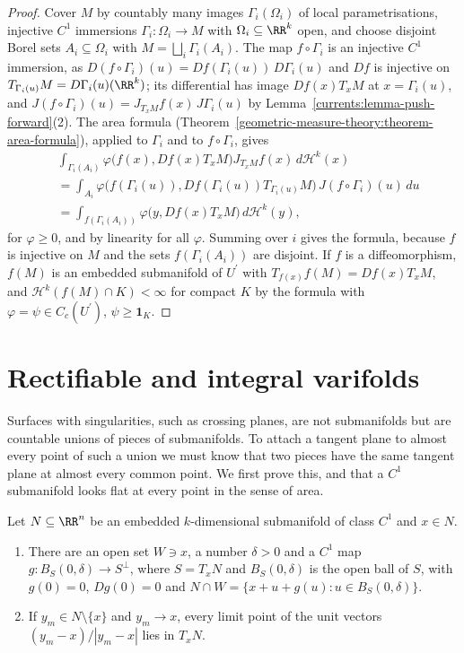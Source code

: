 \begin{proof}
Cover $M$ by countably many images $\Gamma_i(\Omega_i)$ of local parametrisations, injective $C^1$ immersions $\Gamma_i \colon \Omega_i \to M$ with $\Omega_i \subseteq \RR^k$ open, and choose disjoint Borel sets
$A_i \subseteq \Omega_i$ with $M = \bigsqcup_i\Gamma_i(A_i)$. The map $f \circ \Gamma_i$ is an injective $C^1$ immersion, as $D(f \circ \Gamma_i)(u) = Df(\Gamma_i(u))\,D\Gamma_i(u)$ and $Df$ is injective on
$T_{\Gamma_i(u)}M = D\Gamma_i(u)(\RR^k)$; its differential has image $Df(x)T_xM$ at $x = \Gamma_i(u)$, and $J(f \circ \Gamma_i)(u) = J_{T_xM}f(x)\,J\Gamma_i(u)$ by
Lemma~\ref{currents:lemma-push-forward}(2). The area formula (Theorem~\ref{geometric-measure-theory:theorem-area-formula}), applied to $\Gamma_i$ and to $f \circ \Gamma_i$, gives
\[
\begin{aligned}
&\int_{\Gamma_i(A_i)}\varphi\bigl(f(x), Df(x)T_xM\bigr)J_{T_xM}f(x)\,d\mathcal{H}^k(x) \\
&= \int_{A_i}\varphi\bigl(f(\Gamma_i(u)), Df(\Gamma_i(u))T_{\Gamma_i(u)}M\bigr)\,J(f \circ \Gamma_i)(u)\,du \\
&= \int_{f(\Gamma_i(A_i))}\varphi\bigl(y, Df(x)T_xM\bigr)\,d\mathcal{H}^k(y),
\end{aligned}
\]
for $\varphi \geq 0$, and by linearity for all $\varphi$. Summing over $i$ gives the formula, because $f$ is injective on $M$ and the sets $f(\Gamma_i(A_i))$ are disjoint. If $f$ is a diffeomorphism, $f(M)$ is an
embedded submanifold of $U^{\prime}$ with $T_{f(x)}f(M) = Df(x)T_xM$, and $\mathcal{H}^k(f(M) \cap K) < \infty$ for compact $K$ by the formula with $\varphi = \psi \in C_c(U^{\prime})$, $\psi \geq \mathbf{1}_K$.
\end{proof}

\section{Rectifiable and integral varifolds}\label{currents:section-rectifiable-varifolds}

Surfaces with singularities, such as crossing planes, are not submanifolds but are countable unions of pieces of submanifolds. To attach a tangent plane to almost every point of such a union we must know
that two pieces have the same tangent plane at almost every common point. We first prove this, and that a $C^1$ submanifold looks flat at every point in the sense of area.

\begin{lemma}\label{currents:lemma-secant}
Let $N \subseteq \RR^n$ be an embedded $k$-dimensional submanifold of class $C^1$ and $x \in N$.
\begin{enumerate}
\item There are an open set $W \ni x$, a number $\delta > 0$ and a $C^1$ map $g \colon B_S(0, \delta) \to S^\perp$, where $S = T_xN$ and $B_S(0, \delta)$ is the open ball of $S$, with $g(0) = 0$, $Dg(0) = 0$
and $N \cap W = \{x + u + g(u) : u \in B_S(0, \delta)\}$.
\item If $y_m \in N \setminus \{x\}$ and $y_m \to x$, every limit point of the unit vectors $(y_m - x)/|y_m - x|$ lies in $T_xN$.
\end{enumerate}
\end{lemma}

